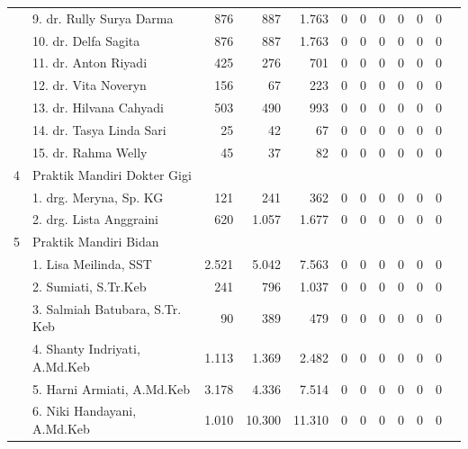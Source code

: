 {\begin{small}
\begin{tabular}{cY{34em}rrrrrrrrrr}
	  & 9. dr. Rully Surya Darma                      &     876 &     887 &   1.763 &      0 &      0 &       0 &     0 &     0 &      0 \\
	  & 10. dr. Delfa Sagita                          &     876 &     887 &   1.763 &      0 &      0 &       0 &     0 &     0 &      0 \\
	  & 11. dr. Anton Riyadi                          &     425 &     276 &     701 &      0 &      0 &       0 &     0 &     0 &      0 \\
	  & 12. dr. Vita Noveryn                          &     156 &      67 &     223 &      0 &      0 &       0 &     0 &     0 &      0 \\
	  & 13. dr. Hilvana Cahyadi                       &     503 &     490 &     993 &      0 &      0 &       0 &     0 &     0 &      0 \\
	  & 14. dr. Tasya Linda Sari                      &      25 &      42 &      67 &      0 &      0 &       0 &     0 &     0 &      0 \\
	  & 15. dr. Rahma Welly                           &      45 &      37 &      82 &      0 &      0 &       0 &     0 &     0 &      0 \\
	4 & Praktik Mandiri Dokter Gigi & & & & & & & & & \\                                                 
	  & 1. drg. Meryna, Sp. KG                        &     121 &     241 &     362 &      0 &      0 &       0 &     0 &     0 &      0 \\
	  & 2. drg. Lista Anggraini                       &     620 &   1.057 &   1.677 &      0 &      0 &       0 &     0 &     0 &      0 \\
  	5 & Praktik Mandiri Bidan & & & & & & & & & \\                                                       
	  & 1. Lisa Meilinda, SST                         &   2.521 &   5.042 &   7.563 &      0 &      0 &       0 &     0 &     0 &      0 \\
	  & 2. Sumiati, S.Tr.Keb                          &     241 &     796 &   1.037 &      0 &      0 &       0 &     0 &     0 &      0 \\
	  & 3. Salmiah Batubara, S.Tr. Keb                &      90 &     389 &     479 &      0 &      0 &       0 &     0 &     0 &      0 \\
	  & 4. Shanty Indriyati, A.Md.Keb                 &   1.113 &   1.369 &   2.482 &      0 &      0 &       0 &     0 &     0 &      0 \\
	  & 5. Harni Armiati, A.Md.Keb                    &   3.178 &   4.336 &   7.514 &      0 &      0 &       0 &     0 &     0 &      0 \\
      & 6. Niki Handayani, A.Md.Keb                   &   1.010 &  10.300 &  11.310 &      0 &      0 &       0 &     0 &     0 &      0 \\
    \end{tabular}%
\end{small}

}

